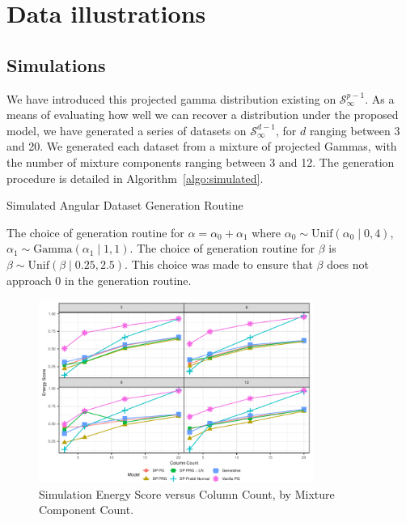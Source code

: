 
\section{Data illustrations\label{sec:results}}

\subsection{Simulations\label{subsec:simulated}}
We have introduced this projected gamma distribution existing on $\mathcal{S}_{\infty}^{p-1}$.  As a
  means of evaluating how well we can recover a distribution under the proposed model, we have
  generated a series of datasets on $\mathcal{S}_{\infty}^{d-1}$, for $d$ ranging between 3 and 20.
  We generated each dataset from a mixture of projected Gammas, with the number of mixture components
  ranging between 3 and 12.  The generation procedure is detailed in Algorithm~\ref{algo:simulated}.
  \begin{algorithm}[htb]
    \caption{Simulated Angular Dataset Generation Routine\label{algo:simulated}}
  \end{algorithm}
  The choice of generation routine for $\alpha = \alpha_0 + \alpha_1$ where
  $\alpha_0 \sim \text{Unif}(\alpha_0\mid 0,4)$, $\alpha_1\sim \text{Gamma}(\alpha_1\mid 1,1)$.
  The choice of generation routine for $\beta$ is $\beta\sim\text{Unif}(\beta\mid 0.25, 2.5)$.
  This choice was made to ensure that $\beta$ does not approach 0 in the generation routine.

\begin{figure}[ht]
  \caption{Simulation Energy Score versus Column Count, by Mixture Component Count.\label{fig:simes}}
  \centering
  \includegraphics[width=0.8\textwidth]{./images/simulation_es}
\end{figure}

